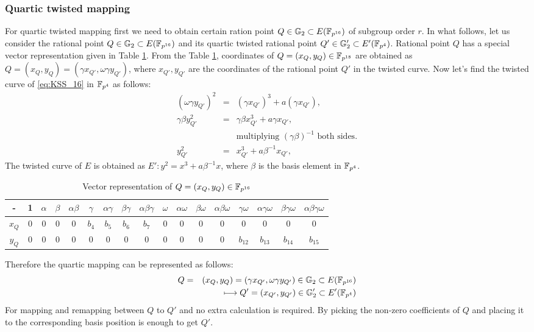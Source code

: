 \subsubsection{Quartic twisted mapping}
For quartic twisted mapping first we need to obtain certain ration point  $Q \in {\mathbb{G}}_{2} \subset E(\mathbb{F}_{p^{16}})$ of subgroup order $r$. 
In what follows, let us consider the rational point $Q \in {\mathbb{G}}_{2} \subset E(\mathbb{F}_{p^{16}})$ and its quartic twisted rational point $Q' \in {\mathbb{G}}_{2}' \subset E'(\mathbb{F}_{p^4})$. Rational point $Q$ has a special vector representation given in  Table \ref{tab_Q}.
From the Table \ref{tab_Q}, coordinates of  $Q = (x_Q,y_Q) \in \mathbb{F}_{p^{18}}$ are obtained as $Q = (x_Q,y_Q) = (\gamma x_{Q'}, \omega \gamma y_{Q'}) $, where $x_{Q'},y_{Q'}$ are the coordinates of the rational point $Q'$ in the twisted curve. Now let's find the twisted curve of \eqref{eq:KSS_16} in $\mathbb{F}_{p^4}$ as follows:
\begin{eqnarray}
(\omega\gamma y_{Q'} )^2 & = & (\gamma x_{Q'})^3 + a (\gamma x_{Q'}), \nonumber \\
\gamma \beta y_{Q'}^2 & = & \gamma \beta x_{Q'}^3 + a \gamma x_{Q'}, \nonumber \\
 && \mbox{multiplying $(\gamma \beta)^{-1}$ both sides.} \nonumber \\
y_{Q'}^2 & = & x_{Q'}^3 + a \beta^{-1}x_{Q'}, 
\end{eqnarray}
 The twisted curve of $E$ is obtained as $E':y^2  =  x^3 + a \beta^{-1}x$, where $\beta$ is the basis element in $\mathbb{F}_{p^4}$. 
 \renewcommand{\baselinestretch}{1.5}
\begin{table*}[t]
\caption{Vector representation of $Q = (x_Q,y_Q) \in \mathbb{F}_{p^{16}}$}
\label{tab_Q}
\centering
\begin{tabular}{*{17}{c}}
\hline 
- & 1 & $\alpha$ & $\beta$ & $\alpha \beta$ & $\gamma$ & $\alpha \gamma$ & $\beta \gamma$ & $\alpha \beta \gamma$ & $\omega$ & $\alpha \omega$ & $ \beta \omega$ & $\alpha \beta \omega$ & $\gamma \omega$ & $\alpha \gamma \omega$ &$ \beta \gamma \omega$ & $\alpha \beta \gamma \omega$\\
  \hline 
$x_Q$ & 0 & 0 & 0 & 0 & $b_4$ & $b_5$ &$ b_6$ & $b_7$ & 0 & 0 & 0 & 0 & 0 & 0 & 0& 0\\
 \hline 
$y_Q$ & 0 & 0 & 0 & 0 & 0 & 0 & 0 & 0 & 0 & 0 & 0 & 0 & $b_{12}$ & $b_{13}$ & $b_{14}$ & $b_{15}$\\
\hline 
\end{tabular}
\end{table*}
\renewcommand{\baselinestretch}{1.0}
Therefore  the quartic mapping can be represented as follows:
 \begin{eqnarray}
 Q & = & (x_Q,y_Q) = (\gamma x_{Q'}, \omega \gamma y_{Q'}) \in {\mathbb{G}}_{2} \subset E(\mathbb{F}_{p^{16}}) \nonumber \\
 & &   \longmapsto  Q' = (x_{Q'}, y_{Q'}) \in {\mathbb{G}}_{2}'  \subset E'(\mathbb{F}_{p^4})   \nonumber
 \end{eqnarray}
For mapping and remapping between $Q$ to $Q'$ and no extra calculation is required. By picking the non-zero coefficients  of $Q$ and placing it to the corresponding basis position is enough to get $Q'$.

